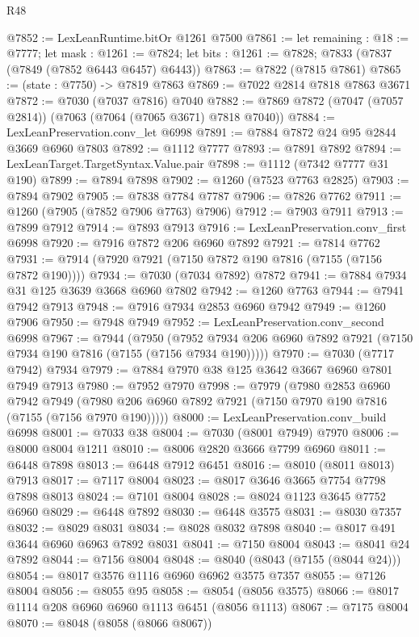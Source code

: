 \begin{lexlean}{R48}
\begin{coremodule}
@7852 := LexLeanRuntime.bitOr @1261 @7500
@7861 := let remaining : @18 := @7777;
  let mask : @1261 := @7824;
  let bits : @1261 := @7828; @7833 (@7837 (@7849 (@7852 @6443 @6457) @6443))
@7863 := @7822 (@7815 @7861)
@7865 := (state : @7750) -> @7819 @7863
@7869 := @7022 @2814 @7818 @7863 @3671
@7872 := @7030 (@7037 @7816) @7040
@7882 := @7869 @7872 (@7047 (@7057 @2814)) (@7063 (@7064 (@7065 @3671) @7818 @7040))
@7884 := LexLeanPreservation.conv_let @6998
@7891 := @7884 @7872 @24 @95 @2844 @3669 @6960 @7803
@7892 := @1112 @7777
@7893 := @7891 @7892
@7894 := LexLeanTarget.TargetSyntax.Value.pair
@7898 := @1112 (@7342 @7777 @31 @190)
@7899 := @7894 @7898
@7902 := @1260 (@7523 @7763 @2825)
@7903 := @7894 @7902
@7905 := @7838 @7784 @7787
@7906 := @7826 @7762
@7911 := @1260 (@7905 (@7852 @7906 @7763) @7906)
@7912 := @7903 @7911
@7913 := @7899 @7912
@7914 := @7893 @7913
@7916 := LexLeanPreservation.conv_first @6998
@7920 := @7916 @7872 @206 @6960 @7892
@7921 := @7814 @7762
@7931 := @7914 (@7920 @7921 (@7150 @7872 @190 @7816 (@7155 (@7156 @7872 @190))))
@7934 := @7030 (@7034 @7892) @7872
@7941 := @7884 @7934 @31 @125 @3639 @3668 @6960 @7802
@7942 := @1260 @7763
@7944 := @7941 @7942 @7913
@7948 := @7916 @7934 @2853 @6960 @7942
@7949 := @1260 @7906
@7950 := @7948 @7949
@7952 := LexLeanPreservation.conv_second @6998
@7967 := @7944
    (@7950 (@7952 @7934 @206 @6960 @7892 @7921 (@7150 @7934 @190 @7816 (@7155 (@7156 @7934 @190)))))
@7970 := @7030 (@7717 @7942) @7934
@7979 := @7884 @7970 @38 @125 @3642 @3667 @6960 @7801 @7949 @7913
@7980 := @7952 @7970
@7998 := @7979
    (@7980
      @2853
      @6960
      @7942
      @7949
      (@7980 @206 @6960 @7892 @7921 (@7150 @7970 @190 @7816 (@7155 (@7156 @7970 @190)))))
@8000 := LexLeanPreservation.conv_build @6998
@8001 := @7033 @38
@8004 := @7030 (@8001 @7949) @7970
@8006 := @8000 @8004 @1211
@8010 := @8006 @2820 @3666 @7799 @6960
@8011 := @6448 @7898
@8013 := @6448 @7912 @6451
@8016 := @8010 (@8011 @8013) @7913
@8017 := @7117 @8004
@8023 := @8017 @3646 @3665 @7754 @7798 @7898 @8013
@8024 := @7101 @8004
@8028 := @8024 @1123 @3645 @7752 @6960
@8029 := @6448 @7892
@8030 := @6448 @3575
@8031 := @8030 @7357
@8032 := @8029 @8031
@8034 := @8028 @8032 @7898
@8040 := @8017 @491 @3644 @6960 @6963 @7892 @8031
@8041 := @7150 @8004
@8043 := @8041 @24 @7892
@8044 := @7156 @8004
@8048 := @8040 (@8043 (@7155 (@8044 @24)))
@8054 := @8017 @3576 @1116 @6960 @6962 @3575 @7357
@8055 := @7126 @8004
@8056 := @8055 @95
@8058 := @8054 (@8056 @3575)
@8066 := @8017 @1114 @208 @6960 @6960 @1113 @6451 (@8056 @1113)
@8067 := @7175 @8004
@8070 := @8048 (@8058 (@8066 @8067))

\end{coremodule}
\end{lexlean}
